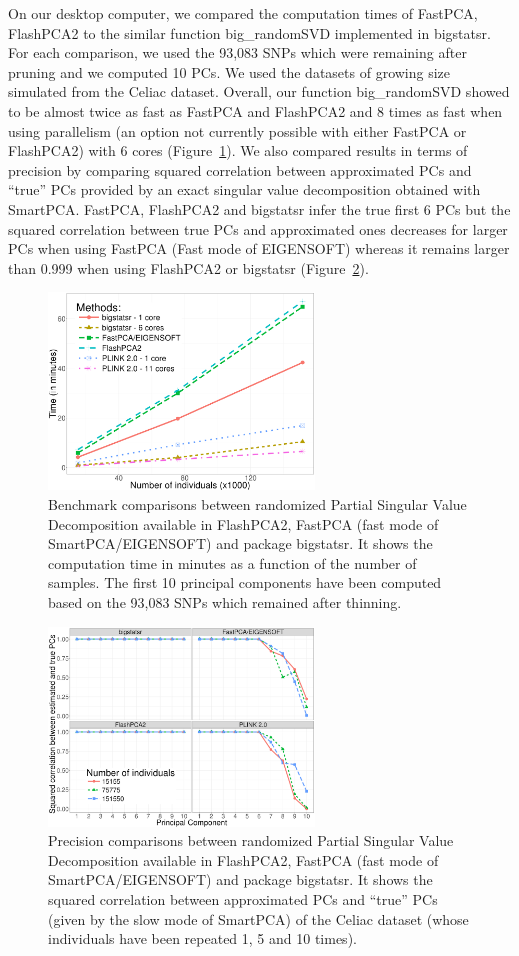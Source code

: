 \documentclass{bioinfo}
\begin{document}
On our desktop computer, we compared the computation times of FastPCA, FlashPCA2 to the similar function big\_randomSVD implemented in bigstatsr. For each comparison, we used the 93,083 SNPs which were remaining after pruning and we computed 10 PCs. We used the datasets of growing size simulated from the Celiac dataset. Overall, our function big\_randomSVD showed to be almost twice as fast as FastPCA and FlashPCA2 and 8 times as fast when using parallelism (an option not currently possible with either FastPCA or FlashPCA2) with 6 cores (Figure~\ref{fig:bench-pca}). We also compared results in terms of precision by comparing squared correlation between approximated PCs and ``true'' PCs provided by an exact singular value decomposition obtained with SmartPCA. FastPCA, FlashPCA2 and bigstatsr infer the true first 6 PCs but the squared correlation between true PCs and approximated ones decreases for larger PCs when using FastPCA (Fast mode of EIGENSOFT) whereas it remains larger than 0.999 when using FlashPCA2 or bigstatsr (Figure~\ref{fig:prec-pca}).   

\begin{figure}[!tpb]
\centerline{\includegraphics[width=200pt]{benchmark-pca.png}}
\caption{Benchmark comparisons between randomized Partial Singular Value Decomposition available in FlashPCA2, FastPCA (fast mode of SmartPCA/EIGENSOFT) and package bigstatsr. It shows the computation time in minutes as a function of the number of samples. The first 10 principal components have been computed based on the 93,083 SNPs which remained after thinning.}\label{fig:bench-pca}
\end{figure}

\begin{figure}[!tpb]
\centerline{\includegraphics[width=200pt]{precision-pca.png}}
\caption{Precision comparisons between randomized Partial Singular Value Decomposition available in FlashPCA2, FastPCA (fast mode of SmartPCA/EIGENSOFT) and package bigstatsr. It shows the squared correlation between approximated PCs and ``true'' PCs (given by the slow mode of SmartPCA) of the Celiac dataset (whose individuals have been repeated 1, 5 and 10 times).}\label{fig:prec-pca}
\end{figure}
\end{document}
